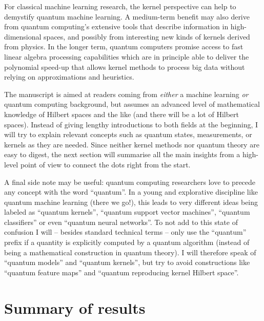 \documentclass[aps, reprint, onecolumn, nofootinbib, longbibliography]{revtex4-2}
\begin{document}
For classical machine learning research, the kernel perspective can help to demystify quantum machine learning. A medium-term benefit may also derive from quantum computing's extensive tools that describe information in high-dimensional spaces, and possibly from interesting new kinds of kernels derived from physics. In the longer term, quantum computers promise access to fast linear algebra processing capabilities which are in principle able to deliver the polynomial speed-up that allows kernel methods to process big data without relying on approximations and heuristics. 

The manuscript is aimed at readers coming from \textit{either} a machine learning \textit{or} quantum computing background, but assumes an advanced level of mathematical knowledge of Hilbert spaces and the like (and there will be a lot of Hilbert spaces). Instead of giving lengthy introductions to both fields at the beginning, I will try to explain relevant concepts such as quantum states, measurements, or kernels as they are needed. Since neither kernel methods nor quantum theory are easy to digest, the next section will summarise all the main insights from a high-level point of view to connect the dots right from the start. 

A final side note may be useful: quantum computing researchers love to precede any concept with the word ``quantum''. In a young and explorative discipline like quantum machine learning (there we go!), this leads to very different ideas being labeled as ``quantum kernels'', ``quantum support vector machines'', ``quantum classifiers'' or even ``quantum neural networks''. To not add to this state of confusion I will -- besides standard technical terms -- only use the ``quantum'' prefix if a quantity is explicitly computed by a quantum algorithm (instead of being a mathematical construction in quantum theory). I will therefore speak of ``quantum models'' and ``quantum kernels'', but try to avoid constructions like ``quantum feature maps'' and ``quantum reproducing kernel Hilbert space''. 

\section{Summary of results}
\end{document}
